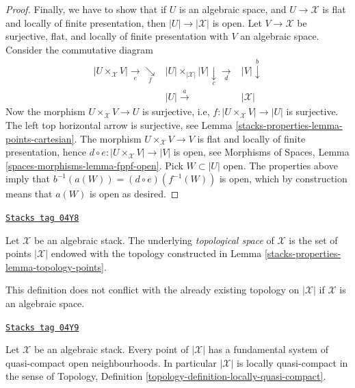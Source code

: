 \begin{proof}
\medskip\noindent
Finally, we have to show that if $U$ is an algebraic space, and
$U \to \mathcal{X}$ is flat and locally of finite presentation, then
$|U| \to |\mathcal{X}|$ is open. Let $V \to \mathcal{X}$ be surjective,
flat, and locally of finite presentation with $V$ an algebraic space.
Consider the commutative diagram
$$
\begin{array}{ccc}|U \times_\mathcal{X} V| \underset{e}{\longrightarrow}\underset{f}{\searrow} & |U| \times_{|\mathcal{X}|} |V| \underset{c}{\downarrow}\underset{d}{\longrightarrow} & |V| \overset{b}{\downarrow} \\  & |U| \overset{a}{\longrightarrow} & |\mathcal{X}|\end{array}
$$
Now the morphism $U \times_\mathcal{X} V \to U$ is surjective, i.e,
$f : |U \times_\mathcal{X} V| \to |U|$ is surjective.
The left top horizontal arrow is surjective, see
Lemma \ref{stacks-properties-lemma-points-cartesian}.
The morphism $U \times_\mathcal{X} V \to V$ is flat and locally of finite
presentation, hence $d \circ e : |U \times_\mathcal{X} V| \to |V|$ is open,
see
Morphisms of Spaces, Lemma \ref{spaces-morphisms-lemma-fppf-open}.
Pick $W \subset |U|$ open. The properties above imply that
$b^{-1}(a(W)) = (d \circ e)(f^{-1}(W))$ is open, which by construction means
that $a(W)$ is open as desired.
\end{proof}

\begin{definition}
\label{stacks-properties-definition-topological-space}
\href{https://stacks.math.columbia.edu/tag/04Y8}{\texttt{Stacks tag 04Y8}}

Let $\mathcal{X}$ be an algebraic stack.
The underlying {\it topological space} of $\mathcal{X}$ is the set of points
$|\mathcal{X}|$ endowed with the topology constructed in
Lemma \ref{stacks-properties-lemma-topology-points}.
\end{definition}

This definition does not conflict with the already existing topology
on $|\mathcal{X}|$ if $\mathcal{X}$ is an algebraic space.

\begin{lemma}
\label{stacks-properties-lemma-space-locally-quasi-compact}
\href{https://stacks.math.columbia.edu/tag/04Y9}{\texttt{Stacks tag 04Y9}}

Let $\mathcal{X}$ be an algebraic stack.
Every point of $|\mathcal{X}|$ has a fundamental system of
quasi-compact open neighbourhoods.
In particular $|\mathcal{X}|$ is locally quasi-compact in the sense of
Topology, Definition \ref{topology-definition-locally-quasi-compact}.
\end{lemma}

